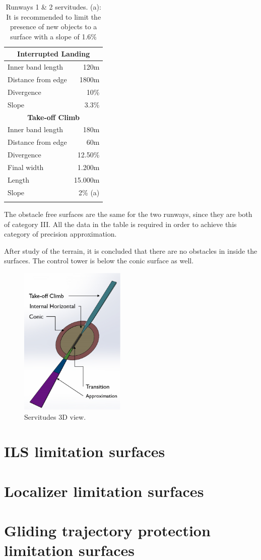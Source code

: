 \begin{longtable}[htb]{@{}lr@{}}
		\midrule[2pt]
		\multicolumn{2}{c}{\textbf{Interrupted Landing} }\\
		\midrule[0.5pt]
		Inner band length & 120m\\
		Distance from edge & 1800m\\
		Divergence & 10\%\\
		Slope & 3.3\%\\
		\midrule[2pt]
		\multicolumn{2}{c}{\textbf{Take-off Climb} }\\
		\midrule[0.5pt]
		Inner band length & 180m\\
		Distance from edge & 60m\\
		Divergence & 12.50\%\\
		Final width & 1.200m\\
		Length & 15.000m\\
		Slope & 2\% (a)\\
		\bottomrule[3pt]
		\caption{Runways 1 \& 2 servitudes. (a): It is recommended to limit the presence of new objects to a surface with a slope of 1.6\%}
	\end{longtable}
	
	The obstacle free surfaces are the same for the two runways, since they are both of category III. All the data in the table is required in order to achieve this category of precision approximation.
	
	After study of the terrain, it is concluded that there are no obstacles in inside the surfaces. The control tower is below the conic surface as well.
	
	
	\begin{figure}[H]
		\centering
		\includegraphics[clip, trim=0cm 0cm 0cm 0cm, width=0.45\textwidth]{./images/servidumbres/3Dservidumbres}
		\caption{Servitudes 3D view.}
		\label{3Dservidumbres}
	\end{figure}

	
	\section{ILS limitation surfaces}
		\section{Localizer limitation surfaces}
		\section{Gliding trajectory protection limitation surfaces}